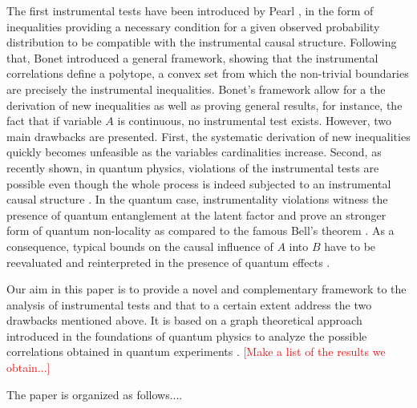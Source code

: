 \documentclass[letterpaper]{article}
\begin{document}
The first instrumental tests have been introduced by Pearl \cite{pearl1995}, in the form of inequalities providing a necessary condition for a given observed probability distribution to be compatible with the instrumental causal structure. Following that, Bonet \cite{} introduced a general framework, showing that the instrumental correlations define a polytope, a convex set from which the non-trivial boundaries are precisely the instrumental inequalities. Bonet's framework allow for a the derivation of new inequalities as well as proving general results, for instance, the fact that if variable $A$ is continuous, no instrumental test exists. However, two main drawbacks are presented. First, the systematic derivation of new inequalities quickly becomes unfeasible as the variables cardinalities increase. Second, as recently shown, in quantum physics, violations of the instrumental tests are possible even though the whole process is indeed subjected to an instrumental causal structure \cite{}. In the quantum case, instrumentality violations witness the presence of quantum entanglement at the latent factor and prove an stronger form of quantum non-locality as compared to the famous Bell's theorem \cite{}. As a consequence, typical bounds on the causal influence of $A$ into $B$ have to be reevaluated and reinterpreted in the presence of quantum effects \cite{}.

Our aim in this paper is to provide a novel and complementary framework to the analysis of instrumental tests and that to a certain extent address the two drawbacks mentioned above. It is based on a graph theoretical approach introduced in the foundations of quantum physics to analyze the possible correlations obtained in quantum experiments \cite{}. \textcolor{red}{[Make a list of the results we obtain...]}

The paper is organized as follows....





\end{document}
